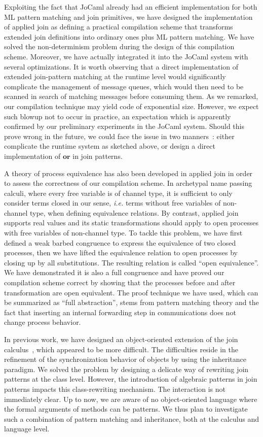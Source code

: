 \documentclass{LMCS}
\makeatletter
\newcommand{\ie}{\emph{i.e.}\@\xspace}
\newcommand{\jocaml}{\textrm{JoCaml}\xspace}
\newcommand{\kwd}[1]{\ensuremath{\mathbf{#1}}}
\renewcommand{\_}{\mathord{\rule[-.25ex]{1ex}{.15ex}}}
\makeatother
\begin{document}
Exploiting the fact that \jocaml already had an efficient
implementation for both ML pattern matching and join primitives, we
have designed the implementation of applied join as defining a
practical compilation scheme that transforms extended join definitions
into ordinary ones plus ML pattern matching. We have solved the
non-determinism problem during the design of this compilation scheme.
Moreover, we have actually integrated it into the \jocaml system with
several optimizations.
It is worth observing that a direct
implementation of extended join-pattern matching at the runtime level
would significantly complicate the management of message queues, which
would then need to be scanned in search of matching messages before
consuming them.
As we remarked, our compilation technique may yield
code of exponential size.
However, we expect such blowup not to occur
in practice, an expectation which is apparently confirmed by
our preliminary experiments in the \jocaml system.
Should this prove wrong in the future, we could
face the issue in two manners~: either complicate the runtime system
as sketched above, or design a direct implementation of \kwd{or} in
join patterns.

A theory of process equivalence has also been developed in applied
join in order to assess the correctness of our compilation scheme. In
archetypal name passing calculi, where every free variable is of
channel type, it is sufficient to only consider terms closed in our
sense, \ie terms without free variables of non-channel type, when
defining equivalence relations. By contrast, applied join supports
real values and its static transformations should apply to open
processes with free variables of non-channel type.  To tackle this
problem, we have first defined a weak barbed congruence to express the
equivalence of two closed processes, then we have lifted the
equivalence relation to open processes by closing up by all
substitutions. The resulting relation is called ``open equivalence''.
We have demonstrated it is also a full congruence and have proved our
compilation scheme correct by showing that the processes before and
after transformation are open equivalent.  The proof technique we have
used, which can be summarized as ``full abstraction'', stems from
pattern matching theory and the fact that inserting an internal
forwarding step in communications does not change process behavior.

In previous work, we have designed an object-oriented extension of the
join
calculus~\cite{FournetLaneve03,MaMaranget2003type,MaMaranget2005hideTR},
which appeared to be more difficult. The difficulties reside in the
refinement of the synchronization behavior of objects by using the
inheritance paradigm. We solved the problem by designing a delicate
way of rewriting join patterns at the class level.  However, the
introduction of algebraic patterns in join patterns impacts this
class-rewriting mechanism. The interaction is not immediately clear.
Up to now, we are aware of no object-oriented language where the
formal arguments of methods can be patterns. We thus plan to
investigate such a combination of pattern matching and inheritance,
both at the calculus and language level.
\end{document}
